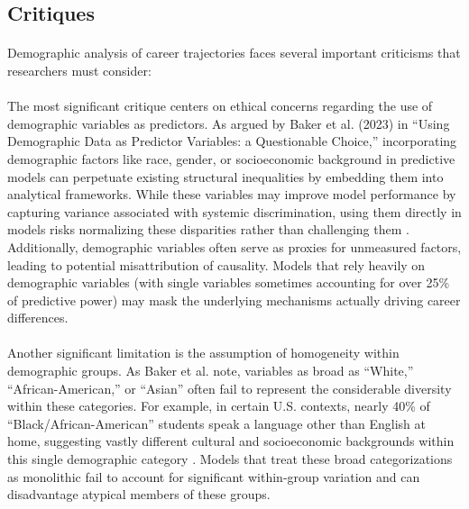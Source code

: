 \documentclass[../main.tex]{subfiles}
\begin{document}
\subsection{Critiques}

\paragraph{} Demographic analysis of career trajectories faces several important criticisms that researchers must consider:

\paragraph{} The most significant critique centers on ethical concerns regarding the use of demographic variables as predictors. As argued by Baker et al. (2023) in ``Using Demographic Data as Predictor Variables: a Questionable Choice,'' incorporating demographic factors like race, gender, or socioeconomic background in predictive models can perpetuate existing structural inequalities by embedding them into analytical frameworks. While these variables may improve model performance by capturing variance associated with systemic discrimination, using them directly in models risks normalizing these disparities rather than challenging them \citep{baker2023demographic}. Additionally, demographic variables often serve as proxies for unmeasured factors, leading to potential misattribution of causality. Models that rely heavily on demographic variables (with single variables sometimes accounting for over 25\% of predictive power) may mask the underlying mechanisms actually driving career differences.

\paragraph{} Another significant limitation is the assumption of homogeneity within demographic groups. As Baker et al. note, variables as broad as ``White,'' ``African-American,'' or ``Asian'' often fail to represent the considerable diversity within these categories. For example, in certain U.S. contexts, nearly 40\% of ``Black/African-American'' students speak a language other than English at home, suggesting vastly different cultural and socioeconomic backgrounds within this single demographic category \citep{baker2023demographic}. Models that treat these broad categorizations as monolithic fail to account for significant within-group variation and can disadvantage atypical members of these groups.
\end{document}
